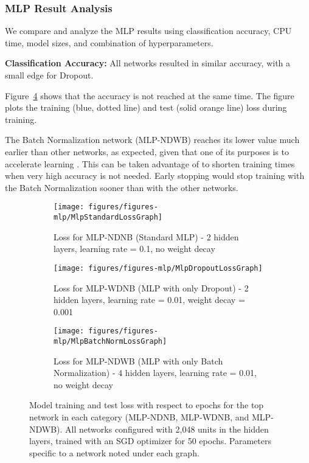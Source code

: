\documentclass[../dropout-vs-batch-normalization.tex]{subfiles}
\begin{document}
\medskip
\subsubsection{MLP Result Analysis} We compare and analyze the MLP results using classification accuracy, CPU time, model sizes, and combination of hyperparameters.

\noindent\textbf{Classification Accuracy:} All networks resulted in similar accuracy, with a small edge for Dropout.

Figure~\ref{fig:MlpLossGraph} shows that the accuracy is not reached at the same time. The figure plots the training (blue, dotted line) and test (solid orange line) loss during training.

The Batch Normalization network (MLP-NDWB) reaches its lower value much earlier than other networks, as expected, given that one of its purposes is to accelerate learning \cite{Ioffe2015}. This can be taken advantage of to shorten training times when very high accuracy is not needed. Early stopping would stop training with the Batch Normalization sooner than with the other networks.

\begin{figure}
    \centering
    \begin{subfigure}{0.5\textwidth}
        \texttt{[image: figures/figures-mlp/MlpStandardLossGraph]} 
        \caption{Loss for MLP-NDNB (Standard MLP) - 2 hidden layers, learning rate = 0.1, no weight decay } \label{fig:MlpStandardLossGraph}
    \end{subfigure}
    \hfill
    \begin{subfigure}{0.5\textwidth}
        \texttt{[image: figures/figures-mlp/MlpDropoutLossGraph]} 
        \caption{Loss for MLP-WDNB (MLP with only Dropout) - 2 hidden layers, learning rate = 0.01, weight decay = 0.001} \label{fig:MlpDropoutLossGraph}
    \end{subfigure}
    \begin{subfigure}{0.5\textwidth}
        \texttt{[image: figures/figures-mlp/MlpBatchNormLossGraph]} 
        \caption{Loss for MLP-NDWB (MLP with only Batch Normalization) - 4 hidden layers, learning rate = 0.01, no weight decay} \label{fig:MlpBatchNormLossGraph}
    \end{subfigure}
    \caption{Model training and test loss with respect to epochs for the top network in each category (MLP-NDNB, MLP-WDNB, and MLP-NDWB). All networks configured with 2,048 units in the hidden layers, trained with an SGD optimizer for 50 epochs. Parameters specific to a network noted under each graph. 
    }
    \label{fig:MlpLossGraph}
\end{figure}
\end{document}
